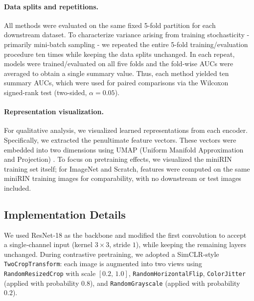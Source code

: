 \documentclass[final,1p,times]{elsarticle}
\begin{document}
\paragraph{Data splits and repetitions.}
All methods were evaluated on the same fixed 5-fold partition for each downstream dataset. To characterize variance arising from training stochasticity - primarily mini-batch sampling - we repeated the entire 5-fold training/evaluation procedure ten times while keeping the data splits unchanged. In each repeat, models were trained/evaluated on all five folds and the fold-wise AUCs were averaged to obtain a single summary value. Thus, each method yielded ten summary AUCs, which were used for paired comparisons via the Wilcoxon signed-rank test (two-sided, $\alpha=0.05$).

\paragraph{Representation visualization.}
For qualitative analysis, we visualized learned representations from each encoder. Specifically, we extracted the penultimate feature vectors. These vectors were embedded into two dimensions using UMAP (Uniform Manifold Approximation and Projection) \cite{mcinnes2018umap}. To focus on pretraining effects, we visualized the miniRIN training set itself; for ImageNet and Scratch, features were computed on the same miniRIN training images for comparability, with no downstream or test images included.
%


\subsection{Implementation Details}
We used ResNet‑18 as the backbone and modified the first convolution to accept a single‑channel input (kernel $3{\times}3$, stride $1$), while keeping the remaining layers unchanged. During contrastive pretraining, we adopted a SimCLR‑style \texttt{TwoCropTransform}: each image is augmented into two views using \texttt{RandomResizedCrop} with scale $[0.2,\,1.0]$, \texttt{RandomHorizontalFlip}, \texttt{ColorJitter} (applied with probability $0.8$), and \texttt{RandomGrayscale} (applied with probability $0.2$).
\end{document}

